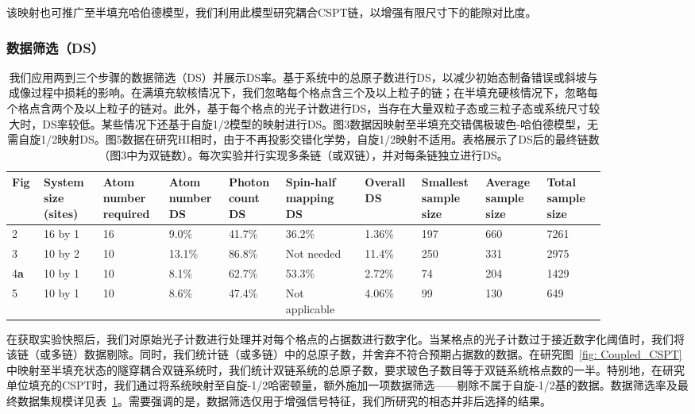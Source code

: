 \documentclass[preprint,superscriptaddress,floatfix,nofootinbib]{revtex4-2}
\begin{document}
该映射也可推广至半填充哈伯德模型，我们利用此模型研究耦合CSPT链，以增强有限尺寸下的能隙对比度。
\subsubsection*{数据筛选（DS）}

\begin{table}[ht]
\begin{ruledtabular}
\begin{tabular}{p{0.04\linewidth} | p{0.09\linewidth} | p{0.1\linewidth} | p{0.09\linewidth} | p{0.08\linewidth} | p{0.12\linewidth} | p{0.08\linewidth} | p{0.09\linewidth} | p{0.09\linewidth} | p{0.09\linewidth}}
    Fig & System size (sites) & Atom number required & Atom number DS & Photon count DS & Spin-half mapping DS & Overall DS & Smallest sample size & Average sample size & Total sample size \\
    \hline
    2 & 16 by 1 & 16 & 9.0\% & 41.7\% & 36.2\% & 1.36\% & 197 & 660 & 7261 \\
    3 & 10 by 2 & 10 & 13.1\% & 86.8\% & Not needed & 11.4\% & 250 & 331 & 2975 \\
    4\textbf{a} & 10 by 1 & 10 & 8.1\% & 62.7\% & 53.3\% & 2.72\% & 74 & 204 & 1429 \\
    5 & 10 by 1 & 10 & 8.6\% & 47.4\% & Not applicable & 4.06\% & 99 & 130 & 649
\end{tabular}
\end{ruledtabular}
\caption{\label{tab:data_size} 我们应用两到三个步骤的数据筛选（DS）并展示DS率。基于系统中的总原子数进行DS，以减少初始态制备错误或斜坡与成像过程中损耗的影响。在满填充软核情况下，我们忽略每个格点含三个及以上粒子的链；在半填充硬核情况下，忽略每个格点含两个及以上粒子的链对。此外，基于每个格点的光子计数进行DS，当存在大量双粒子态或三粒子态或系统尺寸较大时，DS率较低。某些情况下还基于自旋1/2模型的映射进行DS。图3数据因映射至半填充交错偶极玻色-哈伯德模型，无需自旋1/2映射DS。图5数据在研究HI相时，由于不再投影交错化学势，自旋1/2映射不适用。表格展示了DS后的最终链数（图3中为双链数）。每次实验并行实现多条链（或双链），并对每条链独立进行DS。}
\end{table}

在获取实验快照后，我们对原始光子计数进行处理并对每个格点的占据数进行数字化。当某格点的光子计数过于接近数字化阈值时，我们将该链（或多链）数据剔除。同时，我们统计链（或多链）中的总原子数，并舍弃不符合预期占据数的数据。在研究图~\ref{fig: Coupled_CSPT}中映射至半填充状态的隧穿耦合双链系统时，我们统计双链系统的总原子数，要求玻色子数目等于双链系统格点数的一半。特别地，在研究单位填充的CSPT时，我们通过将系统映射至自旋-1/2哈密顿量，额外施加一项数据筛选——剔除不属于自旋-1/2基的数据。数据筛选率及最终数据集规模详见表~\ref{tab:data_size}。需要强调的是，数据筛选仅用于增强信号特征，我们所研究的相态并非后选择的结果。
\end{document}
